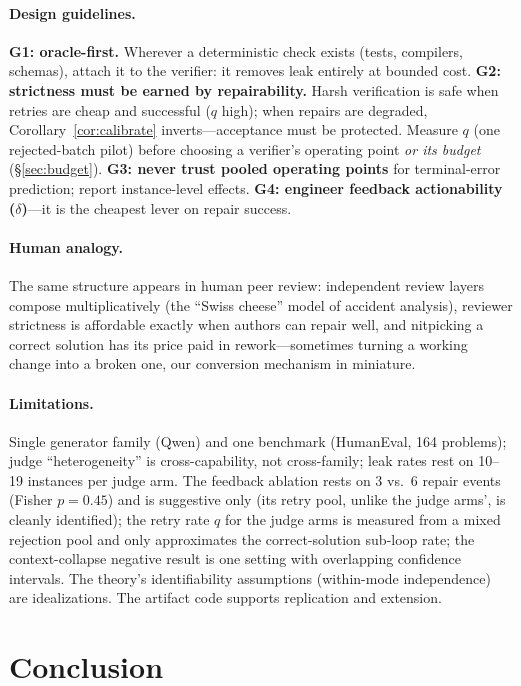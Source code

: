\documentclass[11pt]{article}
\begin{document}
\paragraph{Design guidelines.}
\textbf{G1: oracle-first.}  Wherever a deterministic check exists
(tests, compilers, schemas), attach it to the verifier: it removes
leak entirely at bounded cost.  \textbf{G2: strictness must be
earned by repairability.}  Harsh verification is safe when retries
are cheap and successful ($q$ high); when repairs are degraded,
Corollary~\ref{cor:calibrate} inverts---acceptance must be protected.
Measure $q$ (one rejected-batch pilot) before choosing a verifier's
operating point \emph{or its budget} (§\ref{sec:budget}).
\textbf{G3: never trust pooled operating points}
for terminal-error prediction; report instance-level effects.
\textbf{G4: engineer feedback actionability ($\delta$)}---it is the
cheapest lever on repair success.

\paragraph{Human analogy.}
The same structure appears in human peer review: independent review
layers compose multiplicatively (the ``Swiss cheese'' model of
accident analysis), reviewer strictness is affordable exactly when
authors can repair well, and nitpicking a correct solution has its
price paid in rework---sometimes turning a working change into a
broken one, our conversion mechanism in miniature.

\paragraph{Limitations.}
Single generator family (Qwen) and one benchmark (HumanEval, 164
problems); judge ``heterogeneity'' is cross-capability, not
cross-family; leak rates rest on 10--19 instances per judge arm.
The feedback ablation rests on 3 vs.\ 6 repair events
(Fisher $p = 0.45$) and is suggestive only (its retry pool, unlike
the judge arms', is cleanly identified); the retry rate $q$ for
the judge arms is measured from a mixed rejection pool and only
approximates the correct-solution sub-loop rate; the
context-collapse negative
result is one setting with overlapping confidence intervals.  The
theory's identifiability assumptions (within-mode independence) are
idealizations.  The artifact code supports replication and
extension.

\section{Conclusion}
\end{document}
